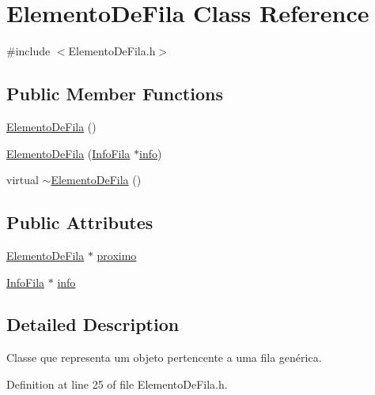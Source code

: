 \hypertarget{classElementoDeFila}{
\section{ElementoDeFila Class Reference}
\label{classElementoDeFila}
}


{\ttfamily \#include $<$ElementoDeFila.h$>$}

\subsection*{Public Member Functions}
\begin{DoxyCompactItemize}
\item 
\hyperlink{classElementoDeFila_a77669d0928094d50d9c87658b5f7c20c}{ElementoDeFila} ()
\item 
\hyperlink{classElementoDeFila_a98e1748e65aaed8bd15cd64c618579ed}{ElementoDeFila} (\hyperlink{classInfoFila}{InfoFila} $\ast$\hyperlink{classElementoDeFila_a0e3028ae1401650c0d2f079cffe62731}{info})
\item 
virtual \hyperlink{classElementoDeFila_aa5bb4960252e258f4918922fb638af9a}{$\sim$ElementoDeFila} ()
\end{DoxyCompactItemize}
\subsection*{Public Attributes}
\begin{DoxyCompactItemize}
\item 
\hyperlink{classElementoDeFila}{ElementoDeFila} $\ast$ \hyperlink{classElementoDeFila_a00a6a658ef48b7b5a6d6f1a9b60c3b94}{proximo}
\item 
\hyperlink{classInfoFila}{InfoFila} $\ast$ \hyperlink{classElementoDeFila_a0e3028ae1401650c0d2f079cffe62731}{info}
\end{DoxyCompactItemize}


\subsection{Detailed Description}
Classe que representa um objeto pertencente a uma fila genérica. 

Definition at line 25 of file ElementoDeFila.h.



